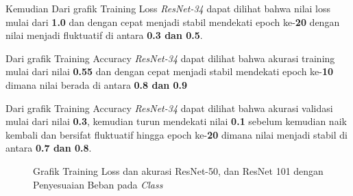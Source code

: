 Kemudian Dari grafik Training Loss \emph{ResNet-34} dapat dilihat bahwa nilai loss mulai dari \textbf{1.0} dan dengan cepat menjadi stabil mendekati epoch ke-\textbf{20} dengan nilai menjadi fluktuatif di antara \textbf{0.3 dan 0.5}.

Dari grafik Training Accuracy \emph{ResNet-34} dapat dilihat bahwa akurasi training mulai dari nilai \textbf{0.55} dan dengan cepat menjadi stabil mendekati epoch ke-\textbf{10} dimana nilai berada di antara \textbf{0.8 dan 0.9} 

Dari grafik Training Accuracy \emph{ResNet-34} dapat dilihat bahwa akurasi validasi mulai dari nilai \textbf{0.3}, kemudian turun mendekati nilai \textbf{0.1} sebelum kemudian naik kembali dan bersifat fluktuatif hingga epoch ke-\textbf{20} dimana nilai menjadi stabil di antara \textbf{0.7 dan 0.8}.

\begin{figure}[H]
	\centering
	\qquad
	\caption{Grafik Training Loss dan akurasi ResNet-50, dan ResNet 101 dengan Penyesuaian Beban pada \emph{Class}}
	\label{fig:graphTrainingWeightedPt2}
\end{figure}


